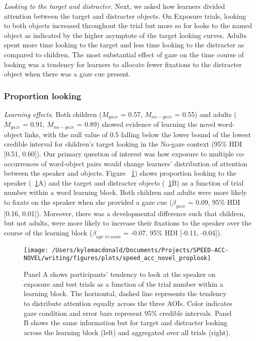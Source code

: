 \documentclass[man,floatsintext]{apa6}
\begin{document}
\emph{Looking to the target and distracter.} Next, we asked how learners
divided attention between the target and distracter objects. On Exposure
trials, looking to both objects increased throughout the trial but more
so for looks to the named object as indicated by the higher asymptote of
the target looking curves. Adults spent more time looking to the target
and less time looking to the distracter as compared to children. The
most substantial effect of gaze on the time course of looking was a
tendency for learners to allocate fewer fixations to the distracter
object when there was a gaze cue present.

\subsubsection{Proportion looking}\label{proportion-looking}

\emph{Learning effects.} Both children (\(M_{gaze}\) = 0.57,
\(M_{no-gaze}\) = 0.55) and adults (\(M_{gaze}\) = 0.91, \(M_{no-gaze}\)
= 0.89) showed evidence of learning the novel word-object links, with
the null value of 0.5 falling below the lower bound of the lowest
credible interval for children's target looking in the No-gaze context
(95\% HDI {[}0.51, 0.60{]}). Our primary question of interest was how
exposure to multiple co-occurrences of word-object pairs would change
learners' distribution of attention between the speaker and objects.
Figure ~\ref{fig:san-prop-looking-plot}) shows proportion looking to the
speaker (~\ref{fig:san-prop-looking-plot}A) and the target and
distracter objects (~\ref{fig:san-prop-looking-plot}B) as a function of
trial number within a word learning block. Both children and adults were
more likely to fixate on the speaker when she provided a gaze cue
(\(\beta_{gaze}\) = 0.09, 95\% HDI {[}0.16, 0.01{]}). Moreover, there
was a developmental difference such that children, but not adults, were
more likely to increase their fixations to the speaker over the course
of the learning block (\(\beta_{age:tr.num}\) = -0.07, 95\% HDI
{[}-0.11, -0.04{]}).

\begin{figure}[!t]

{\centering \texttt{[image: /Users/kylemacdonald/Documents/Projects/SPEED-ACC-NOVEL/writing/figures/plots/speed\_acc\_novel\_proplook]} 

}

\caption{Panel A shows participants’ tendency to look at the speaker on exposure and test trials as a function of the trial number within a learning block. The horizontal, dashed line represents the tendency to distribute attention equally across the three AOIs. Color indicates gaze condition and error bars represent 95\% credible intervals. Panel B shows the same information but for target and distracter looking across the learning block (left) and aggregated over all trials (right).}\label{fig:san-prop-looking-plot}
\end{figure}
\end{document}
